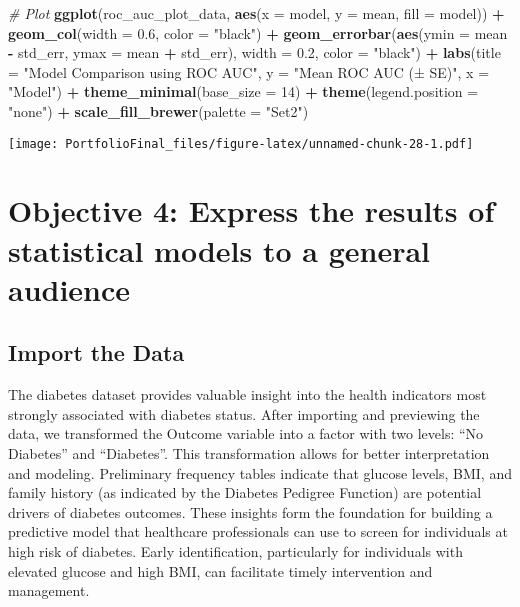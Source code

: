 \documentclass[
]{article}
\newenvironment{Shaded}{\begin{snugshade}}{\end{snugshade}}
\newcommand{\AttributeTok}[1]{\textcolor[rgb]{0.13,0.29,0.53}{#1}}
\newcommand{\CommentTok}[1]{\textcolor[rgb]{0.56,0.35,0.01}{\textit{#1}}}
\newcommand{\DecValTok}[1]{\textcolor[rgb]{0.00,0.00,0.81}{#1}}
\newcommand{\FloatTok}[1]{\textcolor[rgb]{0.00,0.00,0.81}{#1}}
\newcommand{\FunctionTok}[1]{\textcolor[rgb]{0.13,0.29,0.53}{\textbf{#1}}}
\newcommand{\NormalTok}[1]{#1}
\newcommand{\SpecialCharTok}[1]{\textcolor[rgb]{0.81,0.36,0.00}{\textbf{#1}}}
\newcommand{\StringTok}[1]{\textcolor[rgb]{0.31,0.60,0.02}{#1}}
\begin{document}
\begin{Shaded}
\begin{Highlighting}[]
\CommentTok{\# Plot}
\FunctionTok{ggplot}\NormalTok{(roc\_auc\_plot\_data, }\FunctionTok{aes}\NormalTok{(}\AttributeTok{x =}\NormalTok{ model, }\AttributeTok{y =}\NormalTok{ mean, }\AttributeTok{fill =}\NormalTok{ model)) }\SpecialCharTok{+}
  \FunctionTok{geom\_col}\NormalTok{(}\AttributeTok{width =} \FloatTok{0.6}\NormalTok{, }\AttributeTok{color =} \StringTok{"black"}\NormalTok{) }\SpecialCharTok{+}
  \FunctionTok{geom\_errorbar}\NormalTok{(}\FunctionTok{aes}\NormalTok{(}\AttributeTok{ymin =}\NormalTok{ mean }\SpecialCharTok{{-}}\NormalTok{ std\_err, }\AttributeTok{ymax =}\NormalTok{ mean }\SpecialCharTok{+}\NormalTok{ std\_err),}
                \AttributeTok{width =} \FloatTok{0.2}\NormalTok{, }\AttributeTok{color =} \StringTok{"black"}\NormalTok{) }\SpecialCharTok{+}
  \FunctionTok{labs}\NormalTok{(}\AttributeTok{title =} \StringTok{"Model Comparison using ROC AUC"}\NormalTok{,}
       \AttributeTok{y =} \StringTok{"Mean ROC AUC (± SE)"}\NormalTok{,}
       \AttributeTok{x =} \StringTok{"Model"}\NormalTok{) }\SpecialCharTok{+}
  \FunctionTok{theme\_minimal}\NormalTok{(}\AttributeTok{base\_size =} \DecValTok{14}\NormalTok{) }\SpecialCharTok{+}
  \FunctionTok{theme}\NormalTok{(}\AttributeTok{legend.position =} \StringTok{"none"}\NormalTok{) }\SpecialCharTok{+}
  \FunctionTok{scale\_fill\_brewer}\NormalTok{(}\AttributeTok{palette =} \StringTok{"Set2"}\NormalTok{)}
\end{Highlighting}
\end{Shaded}

\texttt{[image: PortfolioFinal\_files/figure-latex/unnamed-chunk-28-1.pdf]}

\section{Objective 4: Express the results of statistical models to a
general
audience}\label{objective-4-express-the-results-of-statistical-models-to-a-general-audience}

\subsection{Import the Data}\label{import-the-data-1}

The diabetes dataset provides valuable insight into the health
indicators most strongly associated with diabetes status. After
importing and previewing the data, we transformed the Outcome variable
into a factor with two levels: ``No Diabetes'' and ``Diabetes''. This
transformation allows for better interpretation and modeling.
Preliminary frequency tables indicate that glucose levels, BMI, and
family history (as indicated by the Diabetes Pedigree Function) are
potential drivers of diabetes outcomes. These insights form the
foundation for building a predictive model that healthcare professionals
can use to screen for individuals at high risk of diabetes. Early
identification, particularly for individuals with elevated glucose and
high BMI, can facilitate timely intervention and management.
\end{document}
